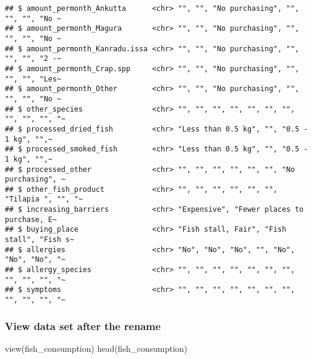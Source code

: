 \documentclass[
]{article}
\newenvironment{Shaded}{\begin{snugshade}}{\end{snugshade}}
\newcommand{\FunctionTok}[1]{\textcolor[rgb]{0.00,0.00,0.00}{#1}}
\newcommand{\NormalTok}[1]{#1}
\begin{document}
\begin{verbatim}
## $ amount_permonth_Ankutta      <chr> "", "", "No purchasing", "", "", "", "No ~
## $ amount_permonth_Magura       <chr> "", "", "No purchasing", "", "", "", "No ~
## $ amount_permonth_Kanradu.issa <chr> "", "", "No purchasing", "", "", "", "2 -~
## $ amount_permonth_Crap.spp     <chr> "", "", "No purchasing", "", "", "", "Les~
## $ amount_permonth_Other        <chr> "", "", "No purchasing", "", "", "", "No ~
## $ other_species                <chr> "", "", "", "", "", "", "", "", "", "", "~
## $ processed_dried_fish         <chr> "Less than 0.5 kg", "", "0.5 - 1 kg", "",~
## $ processed_smoked_fish        <chr> "Less than 0.5 kg", "", "0.5 - 1 kg", "",~
## $ processed_other              <chr> "", "", "", "", "", "", "No purchasing", ~
## $ other_fish_product           <chr> "", "", "", "", "", "", "Tilapia ", "", "~
## $ increasing_barriers          <chr> "Expensive", "Fewer places to purchase, E~
## $ buying_place                 <chr> "Fish stall, Fair", "Fish stall", "Fish s~
## $ allergies                    <chr> "No", "No", "No", "", "No", "No", "No", "~
## $ allergy_species              <chr> "", "", "", "", "", "", "", "", "", "", "~
## $ symptoms                     <chr> "", "", "", "", "", "", "", "", "", "", "~
\end{verbatim}

\hypertarget{view-data-set-after-the-rename}{%
\subsubsection{View data set after the
rename}\label{view-data-set-after-the-rename}}

\begin{Shaded}
\begin{Highlighting}[]
\FunctionTok{view}\NormalTok{(fish\_consumption)}
\FunctionTok{head}\NormalTok{(fish\_consumption)}
\end{Highlighting}
\end{Shaded}
\end{document}
